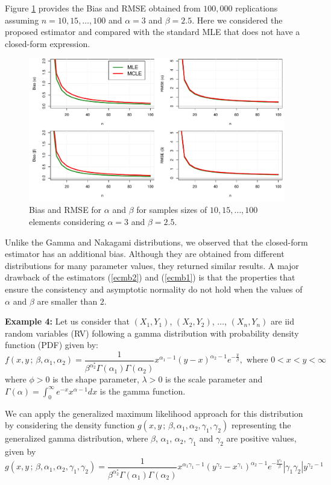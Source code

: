 \documentclass[10pt,a4paper,onecolumn]{article} %
\begin{document}
Figure \ref{fg3} provides the Bias and RMSE obtained from $100,000$ replications assuming $n=10,15,\ldots,100$ and $\alpha=3$ and $\beta=2.5$. Here we considered the proposed estimator and compared with the standard MLE that does not have a closed-form expression.
\begin{figure}[!ht]
\centering
\includegraphics[scale=0.58]{biasbeta.pdf}	
\caption{Bias and RMSE for $\alpha$ and $\beta$ for samples sizes of $10,15,\ldots,100$ elements considering $\alpha=3$ and $\beta=2.5$.}\label{fg3}
\end{figure}

Unlike the Gamma and Nakagami distributions, we observed that the closed-form estimator has an additional bias. Although they are obtained from different distributions for many parameter values, they returned similar results. A major drawback of the estimators (\ref{ecmb2}) and (\ref{ecmb1}) is that the properties that ensure the consistency and asymptotic normality do not hold when the values of $\alpha$ and $\beta$ are smaller than $2$.

\noindent\textbf{Example 4:} Let us consider that $(X_1,Y_1)$, $(X_2,Y_2)$, $\ldots$, $(X_n,Y_n)$   are iid random variables (RV) following a gamma distribution with probability density function (PDF) given by:
\begin{equation}\label{fdpbigamma}
f(x, y\,;\, \beta,\alpha_1,\alpha_2) = \frac{1}{\beta^{\alpha^*_2}\Gamma(\alpha_1)\Gamma(\alpha_2)} x^{\alpha_1 - 1} (y - x)^{\alpha_2 - 1} e^{-\frac{y}{\beta}},\mbox{ where } 0 < x < y < \infty
\end{equation}
where $\phi>0$ is the shape parameter,  $\lambda>0$ is the scale parameter and $\Gamma(\alpha)=\int_{0}^{\infty}{e^{-x}x^{\alpha-1}dx}$ is the  gamma function.

We can apply the generalized maximum likelihood approach for this distribution by considering the density function $g(x,y\,;\,\beta,\alpha_1,\alpha_2,\gamma_1,\gamma_2)$ representing the generalized gamma distribution,  where $\beta$, $\alpha_1$, $\alpha_2$, $\gamma_1$ and $\gamma_2$ are positive values, given by
\begin{equation*}g(x,y\,;\,\beta,\alpha_1,\alpha_2,\gamma_1,\gamma_2) = \frac{1}{\beta^{\alpha^*_2} \Gamma(\alpha_1)\Gamma(\alpha_2)} x^{\alpha_1\gamma_1-1} \left(y^{\gamma_2} - x^{\gamma_1}\right)^{\alpha_2-1} e^{-\frac{y^{\gamma_2}}{\beta}} \left| \gamma_1\gamma_2 \right| y^{\gamma_2 - 1}
\end{equation*}
\end{document}
